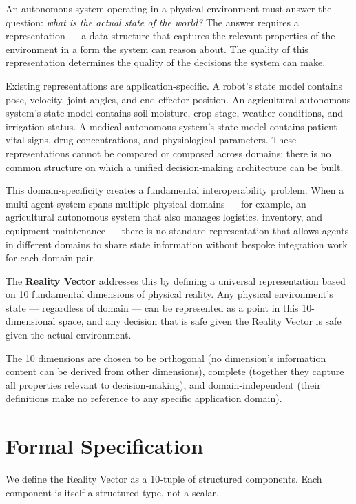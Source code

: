 \documentclass[12pt]{article}
\begin{document}
An autonomous system operating in a physical environment must answer the question: \textit{what is the actual state of the world?} The answer requires a representation --- a data structure that captures the relevant properties of the environment in a form the system can reason about. The quality of this representation determines the quality of the decisions the system can make.

Existing representations are application-specific. A robot's state model contains pose, velocity, joint angles, and end-effector position. An agricultural autonomous system's state model contains soil moisture, crop stage, weather conditions, and irrigation status. A medical autonomous system's state model contains patient vital signs, drug concentrations, and physiological parameters. These representations cannot be compared or composed across domains: there is no common structure on which a unified decision-making architecture can be built.

This domain-specificity creates a fundamental interoperability problem. When a multi-agent system spans multiple physical domains --- for example, an agricultural autonomous system that also manages logistics, inventory, and equipment maintenance --- there is no standard representation that allows agents in different domains to share state information without bespoke integration work for each domain pair.

The \textbf{Reality Vector} addresses this by defining a universal representation based on 10 fundamental dimensions of physical reality. Any physical environment's state --- regardless of domain --- can be represented as a point in this 10-dimensional space, and any decision that is safe given the Reality Vector is safe given the actual environment.

The 10 dimensions are chosen to be orthogonal (no dimension's information content can be derived from other dimensions), complete (together they capture all properties relevant to decision-making), and domain-independent (their definitions make no reference to any specific application domain).

\section{Formal Specification}
\label{sec:formal}

We define the Reality Vector as a 10-tuple of structured components. Each component is itself a structured type, not a scalar.
\end{document}
